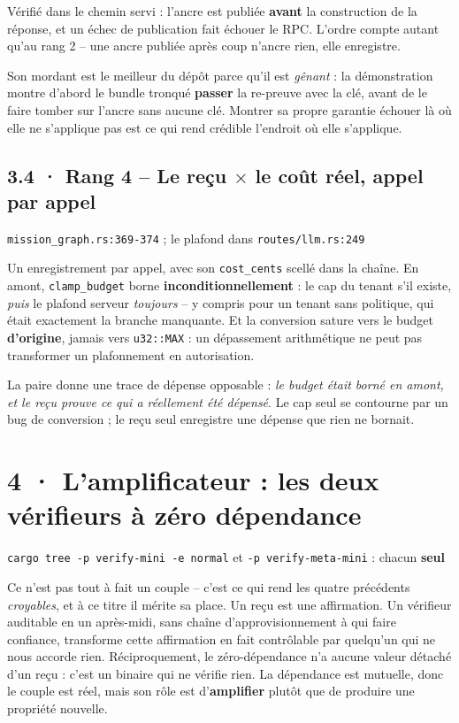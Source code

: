 \documentclass[10pt]{article}
\newcommand{\sz}[1]{{\small\color{grey}\textsf{#1}}}
\newcommand{\code}[1]{\texttt{\small #1}}
\newcommand{\x}{$\times$}
\begin{document}
Vérifié dans le chemin servi : l'ancre est publiée \textbf{avant} la construction de la réponse, et un
échec de publication fait échouer le RPC. L'ordre compte autant qu'au rang 2 -- une ancre publiée après
coup n'ancre rien, elle enregistre.

Son mordant est le meilleur du dépôt parce qu'il est \emph{gênant} : la démonstration montre d'abord le
bundle tronqué \textbf{passer} la re-preuve avec la clé, avant de le faire tomber sur l'ancre sans
aucune clé. Montrer sa propre garantie échouer là où elle ne s'applique pas est ce qui rend crédible
l'endroit où elle s'applique.

\subsection{3.4 · Rang 4 -- Le reçu \x{} le coût réel, appel par appel}

\sz{\code{mission\_graph.rs:369-374} ; le plafond dans \code{routes/llm.rs:249}}

Un enregistrement par appel, avec son \code{cost\_cents} scellé dans la chaîne. En amont,
\code{clamp\_budget} borne \textbf{inconditionnellement} : le cap du tenant s'il existe, \emph{puis} le
plafond serveur \emph{toujours} -- y compris pour un tenant sans politique, qui était exactement la
branche manquante. Et la conversion sature vers le budget \textbf{d'origine}, jamais vers
\code{u32::MAX} : un dépassement arithmétique ne peut pas transformer un plafonnement en autorisation.

La paire donne une trace de dépense opposable : \emph{le budget était borné en amont, et le reçu
prouve ce qui a réellement été dépensé}. Le cap seul se contourne par un bug de conversion ; le reçu
seul enregistre une dépense que rien ne bornait.

\section{4 · L'amplificateur : les deux vérifieurs à zéro dépendance}

\sz{\code{cargo tree -p verify-mini -e normal} et \code{-p verify-meta-mini} : chacun \textbf{seul}}

Ce n'est pas tout à fait un couple -- c'est ce qui rend les quatre précédents \emph{croyables}, et à ce
titre il mérite sa place. Un reçu est une affirmation. Un vérifieur auditable en un après-midi, sans
chaîne d'approvisionnement à qui faire confiance, transforme cette affirmation en fait contrôlable par
quelqu'un qui ne nous accorde rien. Réciproquement, le zéro-dépendance n'a aucune valeur détaché d'un
reçu : c'est un binaire qui ne vérifie rien. La dépendance est mutuelle, donc le couple est réel, mais
son rôle est d'\textbf{amplifier} plutôt que de produire une propriété nouvelle.
\end{document}
